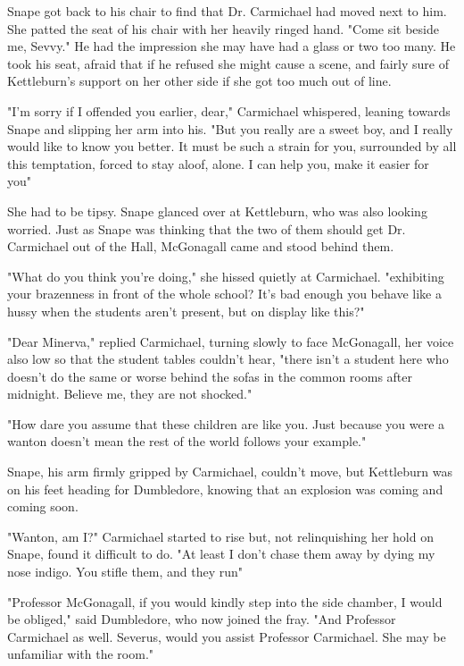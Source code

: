 Snape got back to his chair to find that Dr. Carmichael had moved next to him. She patted the seat of his chair with her heavily ringed hand. "Come sit beside me, Sevvy." He had the impression she may have had a glass or two too many. He took his seat, afraid that if he refused she might cause a scene, and fairly sure of Kettleburn's support on her other side if she got too much out of line.

"I'm sorry if I offended you earlier, dear," Carmichael whispered, leaning towards Snape and slipping her arm into his. "But you really are a sweet boy, and I really would like to know you better. It must be such a strain for you, surrounded by all this temptation, forced to stay aloof, alone. I can help you, make it easier for you{\el}"

She had to be tipsy. Snape glanced over at Kettleburn, who was also looking worried. Just as Snape was thinking that the two of them should get Dr. Carmichael out of the Hall, McGonagall came and stood behind them.

"What do you think you're doing," she hissed quietly at Carmichael. "exhibiting your brazenness in front of the whole school? It's bad enough you behave like a hussy when the students aren't present, but on display like this?"

"Dear Minerva," replied Carmichael, turning slowly to face McGonagall, her voice also low so that the student tables couldn't hear, "there isn't a student here who doesn't do the same or worse behind the sofas in the common rooms after midnight. Believe me, they are not shocked."

"How dare you assume that these children are like you. Just because you were a wanton doesn't mean the rest of the world follows your example."

Snape, his arm firmly gripped by Carmichael, couldn't move, but Kettleburn was on his feet heading for Dumbledore, knowing that an explosion was coming and coming soon.

"Wanton, am I?" Carmichael started to rise but, not relinquishing her hold on Snape, found it difficult to do. "At least I don't chase them away by dying my nose indigo. You stifle them, and they run{\el}"

"Professor McGonagall, if you would kindly step into the side chamber, I would be obliged," said Dumbledore, who now joined the fray. "And Professor Carmichael as well. Severus, would you assist Professor Carmichael. She may be unfamiliar with the room."

